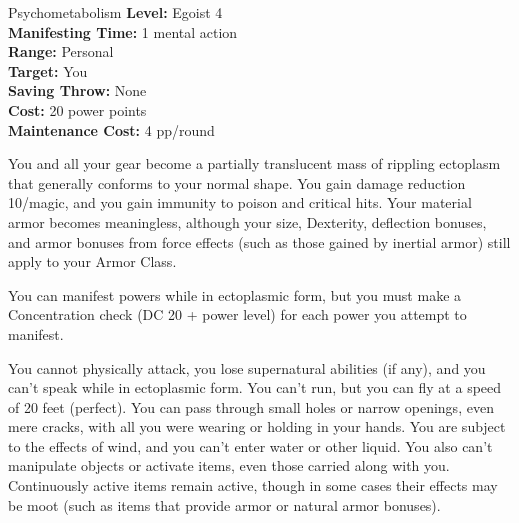 {Psychometabolism}
{
	\textbf{Level:}
	Egoist 4\\
	\textbf{Manifesting Time:}
	1 mental action\\
	\textbf{Range:}
	Personal\\
	\textbf{Target:}
	You\\
	\textbf{Saving Throw:}
	None\\
	\textbf{Cost:}
	20 power points\\
	\textbf{Maintenance Cost:}
	4 pp/round\\
}
{
	You and all your gear become a partially translucent mass of rippling ectoplasm that generally conforms to your normal shape. You gain damage reduction 10/magic, and you gain immunity to poison and critical hits. Your material armor becomes meaningless, although your size, Dexterity, deflection bonuses, and armor bonuses from force effects (such as those gained by inertial armor) still apply to your Armor Class.

	You can manifest powers while in ectoplasmic form, but you must make a Concentration check (DC 20 + power level) for each power you attempt to manifest.

	You cannot physically attack, you lose supernatural abilities (if any), and you can't speak while in ectoplasmic form. You can't run, but you can fly at a speed of 20 feet (perfect). You can pass through small holes or narrow openings, even mere cracks, with all you were wearing or holding in your hands. You are subject to the effects of wind, and you can't enter water or other liquid. You also can't manipulate objects or activate items, even those carried along with you. Continuously active items remain active, though in some cases their effects may be moot (such as items that provide armor or natural armor bonuses).
}